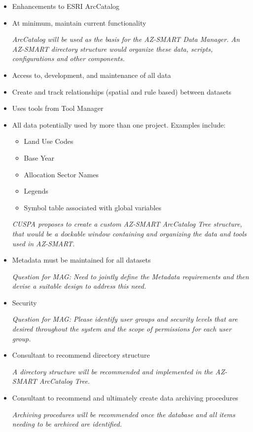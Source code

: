 \begin{itemize}
\item Enhancements to ESRI ArcCatalog
\item At minimum, maintain current functionality

\emph{ArcCatalog will be used as the basis for the AZ-SMART Data Manager.  An AZ-SMART directory structure would organize these data, scripts, configurations and other components.}

\item Access to, development, and maintenance of all data
\item Create and track relationships (spatial and rule based) between datasets
\item Uses tools from Tool Manager
\item All data potentially used by more than one project. Examples include:
\begin{itemize}
\item Land Use Codes
\item Base Year
\item Allocation Sector Names
\item Legends
\item Symbol table associated with global variables
\end{itemize}

\emph{CUSPA proposes to create a custom AZ-SMART ArcCatalog Tree structure, that would be a dockable window containing and organizing the data and tools used in AZ-SMART.}


\item Metadata must be maintained for all datasets

\emph{Question for MAG: Need to jointly define the Metadata requirements and then devise a suitable design to address this need.}

\item Security

\emph{Question for MAG: Please identify user groups and security levels that are desired throughout the system and the scope of permissions for each user group.}

\item Consultant to recommend directory structure

\emph{A directory structure will be recommended and implemented in the AZ-SMART ArcCatalog Tree.}

\item Consultant to recommend and ultimately create data archiving procedures

\emph{Archiving procedures will be recommended once the database and all items needing to be archived are identified.}

\end{itemize}

